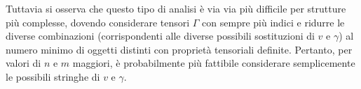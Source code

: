\documentclass{article}
\begin{document}
Tuttavia si osserva che questo tipo di analisi è via via più difficile per strutture più complesse, dovendo considerare tensori $\Gamma$ con sempre più indici e ridurre le diverse combinazioni (corrispondenti alle diverse possibili sostituzioni di $v$ e $\gamma$) al numero minimo di oggetti distinti con proprietà tensoriali definite. Pertanto, per valori di $n$ e $m$ maggiori, è probabilmente più fattibile considerare semplicemente le possibili stringhe di $v$ e $\gamma$.
%
%
%
\end{document}
